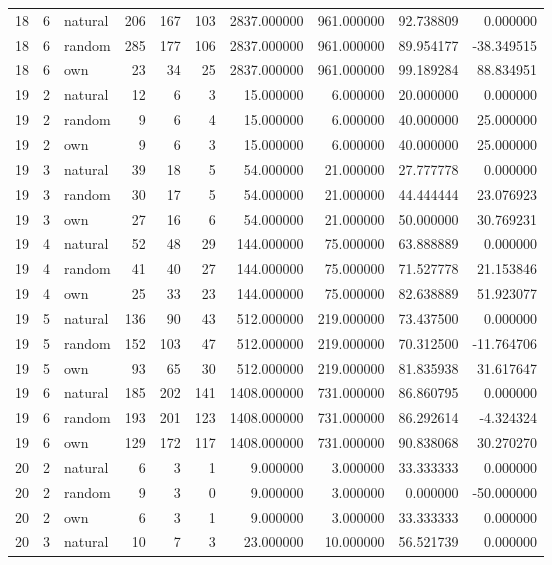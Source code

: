 \begin{table}[htbp]
\begin{tabular}{rrlrrrrrrr}
18 & 6 & natural & 206 & 167 & 103 & 2837.000000 & 961.000000 & 92.738809 & 0.000000 \\
18 & 6 & random & 285 & 177 & 106 & 2837.000000 & 961.000000 & 89.954177 & -38.349515 \\
18 & 6 & own & 23 & 34 & 25 & 2837.000000 & 961.000000 & 99.189284 & 88.834951 \\
19 & 2 & natural & 12 & 6 & 3 & 15.000000 & 6.000000 & 20.000000 & 0.000000 \\
19 & 2 & random & 9 & 6 & 4 & 15.000000 & 6.000000 & 40.000000 & 25.000000 \\
19 & 2 & own & 9 & 6 & 3 & 15.000000 & 6.000000 & 40.000000 & 25.000000 \\
19 & 3 & natural & 39 & 18 & 5 & 54.000000 & 21.000000 & 27.777778 & 0.000000 \\
19 & 3 & random & 30 & 17 & 5 & 54.000000 & 21.000000 & 44.444444 & 23.076923 \\
19 & 3 & own & 27 & 16 & 6 & 54.000000 & 21.000000 & 50.000000 & 30.769231 \\
19 & 4 & natural & 52 & 48 & 29 & 144.000000 & 75.000000 & 63.888889 & 0.000000 \\
19 & 4 & random & 41 & 40 & 27 & 144.000000 & 75.000000 & 71.527778 & 21.153846 \\
19 & 4 & own & 25 & 33 & 23 & 144.000000 & 75.000000 & 82.638889 & 51.923077 \\
19 & 5 & natural & 136 & 90 & 43 & 512.000000 & 219.000000 & 73.437500 & 0.000000 \\
19 & 5 & random & 152 & 103 & 47 & 512.000000 & 219.000000 & 70.312500 & -11.764706 \\
19 & 5 & own & 93 & 65 & 30 & 512.000000 & 219.000000 & 81.835938 & 31.617647 \\
19 & 6 & natural & 185 & 202 & 141 & 1408.000000 & 731.000000 & 86.860795 & 0.000000 \\
19 & 6 & random & 193 & 201 & 123 & 1408.000000 & 731.000000 & 86.292614 & -4.324324 \\
19 & 6 & own & 129 & 172 & 117 & 1408.000000 & 731.000000 & 90.838068 & 30.270270 \\
20 & 2 & natural & 6 & 3 & 1 & 9.000000 & 3.000000 & 33.333333 & 0.000000 \\
20 & 2 & random & 9 & 3 & 0 & 9.000000 & 3.000000 & 0.000000 & -50.000000 \\
20 & 2 & own & 6 & 3 & 1 & 9.000000 & 3.000000 & 33.333333 & 0.000000 \\
20 & 3 & natural & 10 & 7 & 3 & 23.000000 & 10.000000 & 56.521739 & 0.000000 \\

\end{tabular}
\end{table}
